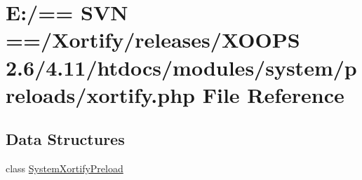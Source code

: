 \hypertarget{system_2preloads_2xortify_8php}{\section{E\-:/== S\-V\-N ==/\-Xortify/releases/\-X\-O\-O\-P\-S 2.6/4.11/htdocs/modules/system/preloads/xortify.php File Reference}
\label{system_2preloads_2xortify_8php}
}
\subsection*{Data Structures}
\begin{DoxyCompactItemize}
\item 
class \hyperlink{class_system_xortify_preload}{System\-Xortify\-Preload}
\end{DoxyCompactItemize}
